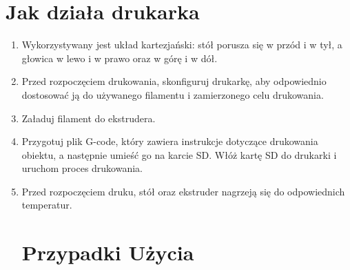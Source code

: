 \documentclass{article}
\begin{document}
\section{Jak działa drukarka}
\begin{enumerate}[label=\arabic*.]
    \item Wykorzystywany jest układ kartezjański: stół porusza się w przód i w tył, a głowica w lewo i w prawo oraz w górę i w dół. 
    \item  Przed rozpoczęciem drukowania, skonfiguruj drukarkę, aby odpowiednio dostosować ją do używanego filamentu i zamierzonego celu drukowania.
    \item Załaduj filament do ekstrudera.
    \item Przygotuj plik G-code, który zawiera instrukcje dotyczące drukowania obiektu, a następnie umieść go na karcie SD. Włóż kartę SD do drukarki i uruchom proces drukowania.
    \item Przed rozpoczęciem druku, stół oraz ekstruder nagrzeją się do odpowiednich temperatur. 

\newpage
\section{Przypadki Użycia}

\begin{comment}


\end{comment}
\end{enumerate}
\end{document}
